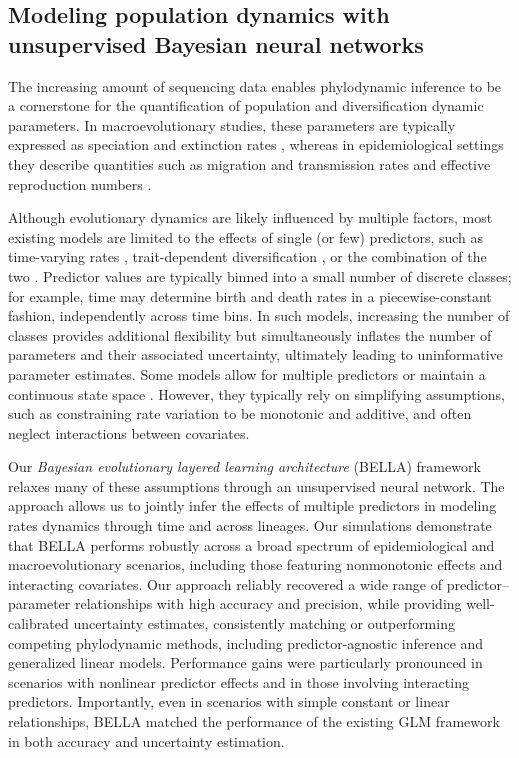 \subsection{Modeling population dynamics with unsupervised Bayesian neural networks}

The increasing amount of sequencing data enables phylodynamic inference to be a cornerstone for the quantification of population and diversification dynamic parameters. 
In macroevolutionary studies, these parameters are typically expressed as speciation and extinction rates \citep{stadler2013can, morlon2014phylogenetic, morlon2024phylogenetic}, whereas in epidemiological settings they describe quantities such as migration and transmission rates and effective reproduction numbers \citep{stadler2014insights, vasylyeva2019tracing, giovanetti2020genomic, seemann2020tracking, guinat2023bayesian}. 

Although evolutionary dynamics are likely influenced by multiple factors, most existing models are limited to the effects of single (or few) predictors, such as time-varying rates \citep{stadler2011mammalian, vaughan2024estimates, condamine2013macroevolutionary}, trait-dependent diversification \citep{maddison2007estimating}, or the combination of the two \cite{Vaughan2025BDMM}.
Predictor values are typically binned into a small number of discrete classes; for example, time may determine birth and death rates in a piecewise-constant fashion, independently across time bins.
In such models, increasing the number of classes provides additional flexibility but simultaneously inflates the number of parameters and their associated uncertainty, ultimately leading to uninformative parameter estimates.
Some models allow for multiple predictors or maintain a continuous state space \citep{beaulieu2016detecting, helmstetter2016viviparity, lemey2014unifying, muller2019inferring, valenzuela2021comprehensive}.
However, they typically rely on simplifying assumptions, such as constraining rate variation to be monotonic and additive, and often neglect interactions between covariates.

Our \textit{Bayesian evolutionary layered learning architecture} (BELLA) framework relaxes many of these assumptions through an unsupervised neural network.
The approach allows us to jointly infer the effects of multiple predictors in modeling rates dynamics through time and across lineages.
Our simulations demonstrate that BELLA performs robustly across a broad spectrum of epidemiological and macroevolutionary scenarios, including those featuring nonmonotonic effects and interacting covariates. 
Our approach reliably recovered a wide range of predictor–parameter relationships with high accuracy and precision, while providing well-calibrated uncertainty estimates, consistently matching or outperforming competing phylodynamic methods, including predictor-agnostic inference and generalized linear models.
Performance gains were particularly pronounced in scenarios with nonlinear predictor effects and in those involving interacting predictors.
Importantly, even in scenarios with simple constant or linear relationships, BELLA matched the performance of the existing GLM framework in both accuracy and uncertainty estimation.


